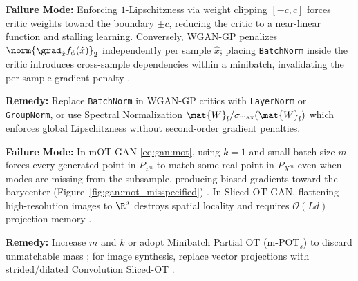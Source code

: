 \documentclass[../../../../master.tex]{subfiles}
\begin{document}
\begin{pitfall}
\textbf{Failure Mode:} Enforcing $1$-Lipschitzness via weight clipping $[-c, c]$ forces critic weights toward the boundary $\pm c$, reducing the critic to a near-linear function and stalling learning. Conversely, WGAN-GP penalizes $\norm{\grad_{\hat{x}} f_\phi(\hat{x})}_2$ independently per sample $\hat{x}$; placing \texttt{BatchNorm} inside the critic introduces cross-sample dependencies within a minibatch, invalidating the per-sample gradient penalty .

\textbf{Remedy:} Replace \texttt{BatchNorm} in WGAN-GP critics with \texttt{LayerNorm} or \texttt{GroupNorm}, or use Spectral Normalization $\mat{W}_l / \sigma_{\max}(\mat{W}_l)$ which enforces global Lipschitzness without second-order gradient penalties.
\end{pitfall}

\begin{pitfall}
\textbf{Failure Mode:} In mOT-GAN \eqref{eq:gan:mot}, using $k=1$ and small batch size $m$ forces every generated point in $P_{z^m}$ to match some real point in $P_{X^m}$ even when modes are missing from the subsample, producing biased gradients toward the barycenter (Figure~\ref{fig:gan:mot_misspecified}) . In Sliced OT-GAN, flattening high-resolution images to $\R^d$ destroys spatial locality and requires $\mathcal{O}(Ld)$ projection memory .

\textbf{Remedy:} Increase $m$ and $k$ or adopt Minibatch Partial OT ($\mathrm{m\text{-}POT}_s$) to discard unmatchable mass ; for image synthesis, replace vector projections with strided/dilated Convolution Sliced-OT .
\end{pitfall}
\end{document}
